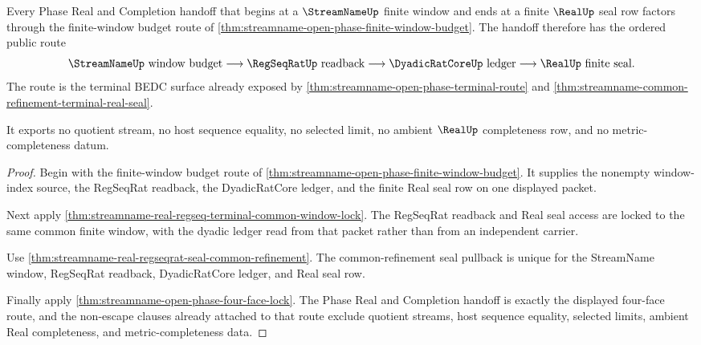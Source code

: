 \begin{theorem}
\label{thm:streamname-open-phase-real-seal-route}
Every Phase Real and Completion handoff that begins at a $\StreamNameUp$ finite window and ends at a finite $\RealUp$ seal row factors through the finite-window budget route of \autoref{thm:streamname-open-phase-finite-window-budget}. The handoff therefore has the ordered public route
$$
\StreamNameUp\text{ window budget}\longrightarrow \RegSeqRatUp\text{ readback}\longrightarrow \DyadicRatCoreUp\text{ ledger}\longrightarrow \RealUp\text{ finite seal}.
$$
The route is the terminal BEDC surface already exposed by \autoref{thm:streamname-open-phase-terminal-route} and \autoref{thm:streamname-common-refinement-terminal-real-seal}.

It exports no quotient stream, no host sequence equality, no selected limit, no ambient $\RealUp$ completeness row, and no metric-completeness datum.
\end{theorem}
\begin{proof}
Begin with the finite-window budget route of \autoref{thm:streamname-open-phase-finite-window-budget}. It supplies the nonempty window-index source, the RegSeqRat readback, the DyadicRatCore ledger, and the finite Real seal row on one displayed packet.

Next apply \autoref{thm:streamname-real-regseq-terminal-common-window-lock}. The RegSeqRat readback and Real seal access are locked to the same common finite window, with the dyadic ledger read from that packet rather than from an independent carrier.

Use \autoref{thm:streamname-real-regseqrat-seal-common-refinement}. The common-refinement seal pullback is unique for the StreamName window, RegSeqRat readback, DyadicRatCore ledger, and Real seal row.

Finally apply \autoref{thm:streamname-open-phase-four-face-lock}. The Phase Real and Completion handoff is exactly the displayed four-face route, and the non-escape clauses already attached to that route exclude quotient streams, host sequence equality, selected limits, ambient Real completeness, and metric-completeness data.
\end{proof}

